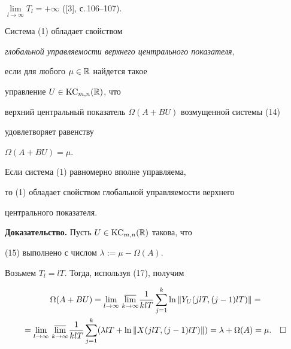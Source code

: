 $\lim\limits_{l\to\infty}T_l=+\infty$ ([3], с.\,106--107).





\begin{defn} Система (1) обладает свойством


{\it глобальной управляемости верхнего центрального показателя},


если для любого $\mu\in\Bbb R$ найдется такое


управление $U\in\operatorname{KC}_{m,n}(\Bbb R)$, что


верхний центральный показатель $\Omega(A+BU)$ возмущенной системы (14)


удовлетворяет равенству


$\Omega(A+BU)=\mu$.


\end{defn}





\begin{cor} Если система (1) равномерно вполне управляема,


то (1) обладает свойством глобальной управляемости верхнего


центрального показателя.


\end{cor}





{\bf Доказательство.} Пусть $U\in\operatorname{KC}_{m,n}(\Bbb R)$ такова, что


(15) выполнено с числом $\lambda:=\mu-\Omega(A)$.


Возьмем $T_{l}=lT$. Тогда, используя (17), получим


\begin{multline*}


\Omega(A+BU)=\lim_{l\to\infty}\,\mylim{k}


\frac{1}{klT}\sum_{j=1}^{k}\ln\|Y_{U}(jlT,(j-1)lT)\|=\\


=\lim_{l\to\infty}\,\mylim{k}


\frac{1}{klT}\sum_{j=1}^{k}(\lambda lT+\ln\|X(jlT,(j-1)lT)\|)=


\lambda+\Omega(A)=\mu.\quad\square


\end{multline*}





